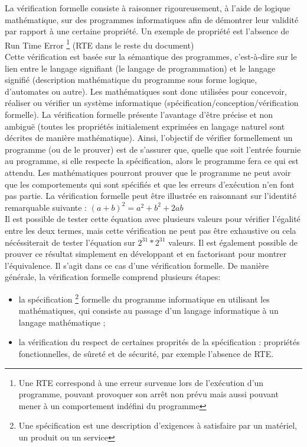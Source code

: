 La vérification formelle consiste à raisonner rigoureusement, à l'aide de logique mathématique, sur des programmes informatiques afin de démontrer leur validité par rapport à une certaine propriété. Un exemple de propriété est l'absence de Run Time Error \footnote{Une RTE correspond à une erreur survenue lors de l'exécution d'un programme, pouvant provoquer son arrêt non prévu mais aussi pouvant mener à un comportement indéfini du programme} (RTE dans le reste du document)
\\
Cette vérification est basée sur la sémantique des programmes, c'est-à-dire sur le lien entre le langage signifiant (le langage de programmation) et le langage signifié (description mathématique du programme sous forme logique, d'automates ou autre).
Les mathématiques sont donc utilisées pour concevoir, réaliser ou vérifier un système informatique (spécification/conception/vérification formelle). La vérification formelle présente l'avantage d'être précise et non ambiguë (toutes les propriétés initialement exprimées en langage naturel sont décrites de manière mathématique).
Ainsi, l'objectif de vérifier formellement un programme (ou de le prouver) est de s’assurer que, quelle que soit l’entrée fournie au programme, si elle respecte la spécification, alors le programme fera ce qui est attendu. Les mathématiques pourront prouver que le programme ne peut avoir que les comportements qui sont spécifiés et que les erreurs d’exécution n’en font pas partie.
\newline
\newline
\noindent
La vérification formelle peut être illustrée en raisonnant sur l'identité remarquable suivante : $ (a + b)^2 = a^2 + b^2 + 2ab $
\\
\noindent Il est possible de tester cette équation avec plusieurs valeurs pour vérifier l'égalité entre les deux termes, mais cette vérification ne peut pas être exhaustive ou cela nécéssiterait de tester l'équation sur $2^{31}*2^{31}$ valeurs. Il est également possible de prouver ce résultat simplement en développant et en factorisant pour montrer l’équivalence. Il s'agit dans ce cas d'une vérification formelle.
\newline
\newline
\noindent
De manière générale, la vérification formelle comprend plusieurs étapes:
\begin{itemize}
	\item la spécification \footnote{Une spécification est une description d'exigences à satisfaire par un matériel, un produit ou un service} formelle du programme informatique en utilisant les mathématiques, qui consiste au passage d'un langage informatique à un langage mathématique ;
	\item la vérification du respect de certaines proprités de la spécification : propriétés fonctionnelles, de sûreté et de sécurité, par exemple l'absence de RTE.
\end{itemize}

